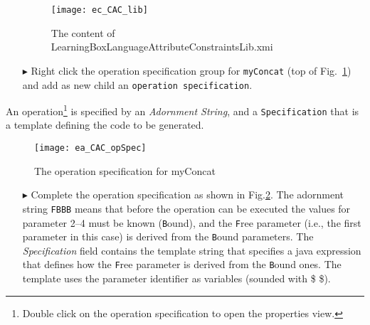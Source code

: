 \begin{itemize}
\begin{figure}[htbp]
\begin{center}
  \texttt{[image: ec\_CAC\_lib]}
  \caption{The content of LearningBoxLanguageAttributeConstraintsLib.xmi}  
  \label{ec_CAC_lib}
\end{center}
\end{figure}
\item[$\blacktriangleright$] Right click the operation specification group for \texttt{myConcat} (top of Fig.~\ref{ec_CAC_lib}) and add as new child an \texttt{operation specification}. 
\end{itemize}

An operation\footnote{Double click on the operation specification to open the properties view.} is specified by an \emph{Adornment String}, and a \texttt{Specification} that is a template defining the code to be generated.

\begin{figure}[htbp]
\begin{center}
  \texttt{[image: ea\_CAC\_opSpec]}
  \caption{The operation specification for myConcat}  
  \label{ea_CAC_opSpec}
\end{center}
\end{figure}

\begin{itemize}
\item[$\blacktriangleright$] Complete the operation specification as shown in Fig.\ref{ea_CAC_opSpec}. The adornment string \texttt{FBBB} means that before the operation can be executed the values for parameter 2--4 must be known (\texttt{B}ound), and the \texttt{F}ree parameter (i.e., the first parameter in this case) is derived from the \texttt{B}ound parameters. The \emph{Specification} field contains the template string that specifies a java expression that defines how the \texttt{F}ree parameter is derived from the \texttt{B}ound ones. The template uses the parameter identifier as variables (sounded with \$ \$). 

\end{itemize}



\goodbreak
 

